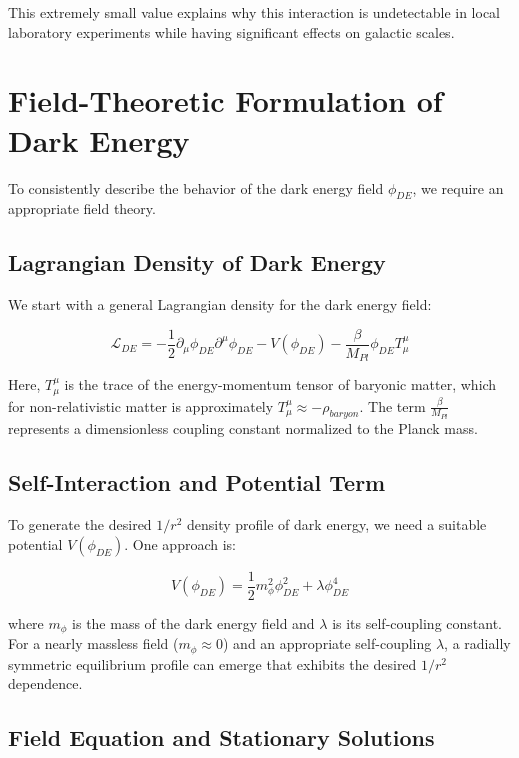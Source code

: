 \documentclass[a4paper,12pt]{article}
\begin{document}
This extremely small value explains why this interaction is undetectable in local laboratory experiments while having significant effects on galactic scales.

\section{Field-Theoretic Formulation of Dark Energy}

To consistently describe the behavior of the dark energy field $\phi_{DE}$, we require an appropriate field theory.

\subsection{Lagrangian Density of Dark Energy}

We start with a general Lagrangian density for the dark energy field:

\begin{equation}
	\mathcal{L}_{DE} = -\frac{1}{2}\partial_\mu \phi_{DE} \partial^\mu \phi_{DE} - V(\phi_{DE}) - \frac{\beta}{M_{Pl}} \phi_{DE} T^{\mu}_{\mu}
\end{equation}

Here, $T^{\mu}_{\mu}$ is the trace of the energy-momentum tensor of baryonic matter, which for non-relativistic matter is approximately $T^{\mu}_{\mu} \approx -\rho_{baryon}$. The term $\frac{\beta}{M_{Pl}}$ represents a dimensionless coupling constant normalized to the Planck mass.

\subsection{Self-Interaction and Potential Term}

To generate the desired $1/r^2$ density profile of dark energy, we need a suitable potential $V(\phi_{DE})$. One approach is:

\begin{equation}
	V(\phi_{DE}) = \frac{1}{2}m_{\phi}^2\phi_{DE}^2 + \lambda \phi_{DE}^4
\end{equation}

where $m_{\phi}$ is the mass of the dark energy field and $\lambda$ is its self-coupling constant. For a nearly massless field ($m_{\phi} \approx 0$) and an appropriate self-coupling $\lambda$, a radially symmetric equilibrium profile can emerge that exhibits the desired $1/r^2$ dependence.

\subsection{Field Equation and Stationary Solutions}
\end{document}
